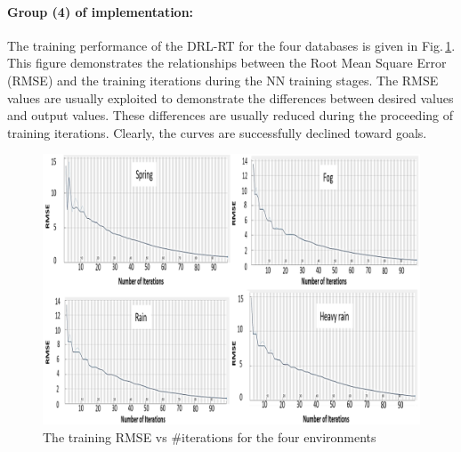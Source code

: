 \documentclass{svproc}
\renewcommand{\tt}[1]{\textcolor{red} {TT: #1 :TT} }
\begin{document}
	\paragraph{\textbf{Group (4) of implementation:}} 
		The training performance of the DRL-RT for the four databases is given in Fig.\,\ref{fig:training_curves}. This figure demonstrates the relationships between the Root Mean Square Error (RMSE) and the training iterations during the NN training stages. The RMSE values are usually exploited to demonstrate the differences between desired values and output values. These differences are usually reduced during the proceeding of training iterations. Clearly, the curves are successfully declined toward goals.
	
	\begin{figure}[!ht]
		\centering
		\includegraphics[scale=.5]{RMSE.png}
		\caption{The training RMSE vs \#iterations for the four environments}
		\label{fig:training_curves}
	\end{figure}
\end{document}

